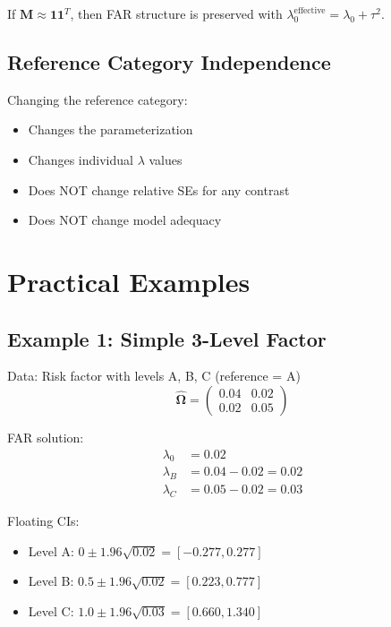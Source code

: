 \documentclass[11pt]{article}
\begin{document}
If $\mathbf{M} \approx \mathbf{1}\mathbf{1}^T$, then FAR structure is preserved with $\lambda_0^{\text{effective}} = \lambda_0 + \tau^2$.

\subsection{Reference Category Independence}

Changing the reference category:
\begin{itemize}
    \item Changes the parameterization
    \item Changes individual $\lambda$ values
    \item Does NOT change relative SEs for any contrast
    \item Does NOT change model adequacy
\end{itemize}

\section{Practical Examples}

\subsection{Example 1: Simple 3-Level Factor}

Data: Risk factor with levels A, B, C (reference = A)
\begin{equation}
    \hat{\boldsymbol{\Omega}} = \begin{pmatrix}
        0.04 & 0.02 \\
        0.02 & 0.05
    \end{pmatrix}
\end{equation}

FAR solution:
\begin{align}
    \lambda_0 &= 0.02 \\
    \lambda_B &= 0.04 - 0.02 = 0.02 \\
    \lambda_C &= 0.05 - 0.02 = 0.03
\end{align}

Floating CIs:
\begin{itemize}
    \item Level A: $0 \pm 1.96\sqrt{0.02} = [-0.277, 0.277]$
    \item Level B: $0.5 \pm 1.96\sqrt{0.02} = [0.223, 0.777]$
    \item Level C: $1.0 \pm 1.96\sqrt{0.03} = [0.660, 1.340]$
\end{itemize}
\end{document}
